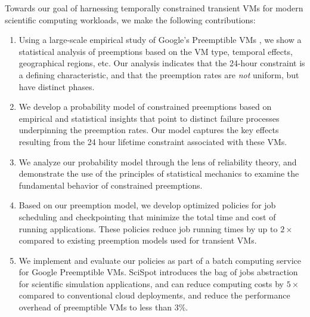 Towards our goal of harnessing temporally constrained transient VMs for modern scientific computing workloads, 
we make the following contributions:
\begin{enumerate} [leftmargin=12pt]
\item Using a large-scale empirical study of Google's Preemptible VMs \footnotemark, we show a statistical analysis of preemptions based on the VM type, temporal effects, geographical regions, etc. Our analysis indicates that the 24-hour constraint is a defining characteristic, and that the preemption rates are \emph{not} uniform, but have distinct phases. 

\item We develop a probability model of constrained preemptions based on empirical and statistical insights that point to distinct failure processes underpinning the preemption rates. Our model captures the key effects resulting from the 24 hour lifetime constraint associated with these VMs.

\item We analyze our probability model through the lens of reliability theory, and demonstrate the use of the principles of statistical mechanics to examine the fundamental behavior of constrained preemptions. 

  


\item Based on our preemption model, we develop optimized policies for job scheduling and checkpointing that minimize the total time and cost of running applications. These policies reduce job running times by up to $2\times$ compared to existing preemption models used for transient VMs. 
  

\item We implement and evaluate our policies as part of a batch computing service for Google Preemptible VMs. SciSpot introduces the bag of jobs abstraction for scientific simulation applications, and can reduce computing costs by $5\times$ compared to conventional cloud deployments, and reduce the performance overhead of preemptible VMs to less than $3\%$. 


\end{enumerate}
